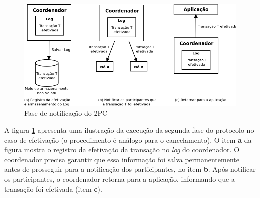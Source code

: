 \documentclass[11pt,twoside,a4paper]{book}
\begin{document}
\begin{figure}
  \centering
  \includegraphics[width=\textwidth]{fase_notificacao_2pc} 
  \caption{Fase de notificação do 2PC}
  \label{fig:fase_notificacao_2pc} 
\end{figure}

A figura \ref{fig:fase_notificacao_2pc} apresenta uma ilustração da execução da segunda fase do protocolo no caso de efetivação (o procedimento é análogo para o cancelamento). O item \textbf{a} da figura mostra o registro da efetivação da transação no \emph{log} do coordenador. O coordenador precisa garantir que essa informação foi salva permanentemente antes de prosseguir para a notificação dos participantes, no item \textbf{b}. Após notificar os participantes, o coordenador retorna para a aplicação, informando que a transação foi efetivada (item \textbf{c}). 


\end{document}
